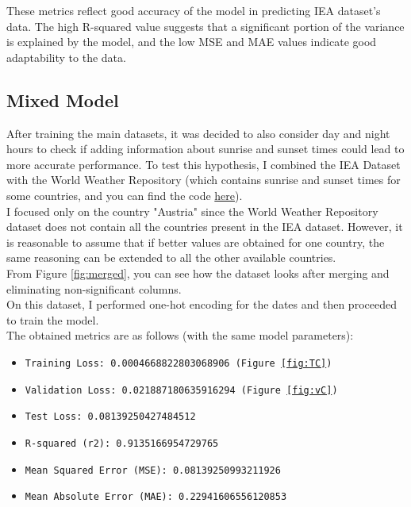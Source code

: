 \documentclass[12pt]{article}
\begin{document}
These metrics reflect good accuracy of the model in predicting IEA dataset's data. The high R-squared value suggests that a significant portion of the variance is explained by the model, and the low MSE and MAE values indicate good adaptability to the data.

\subsection{Mixed Model}
After training the main datasets, it was decided to also consider day and night hours to check if adding information about sunrise and sunset times could lead to more accurate performance. To test this hypothesis, I combined the IEA Dataset with the World Weather Repository (which contains sunrise and sunset times for some countries, and you can find the code \href{https://www.kaggle.com/code/alessandromajumba/iea-model-world-weather-repository}{here}).
\\
I focused only on the country "Austria" since the World Weather Repository dataset does not contain all the countries present in the IEA dataset. However, it is reasonable to assume that if better values are obtained for one country, the same reasoning can be extended to all the other available countries.
\\
From Figure \ref{fig:merged}, you can see how the dataset looks after merging and eliminating non-significant columns.
\\
On this dataset, I performed one-hot encoding for the dates and then proceeded to train the model.
\\
The obtained metrics are as follows (with the same model parameters):
\begin{itemize}
    \item \texttt{Training Loss: 0.0004668822803068906 (Figure \ref{fig:TC})}
    \item \texttt{Validation Loss: 0.021887180635916294 (Figure \ref{fig:vC})}
    \item \texttt{Test Loss: 0.08139250427484512}
    \item \texttt{R-squared (r2): 0.9135166954729765}
    \item \texttt{Mean Squared Error (MSE): 0.08139250993211926} 
    \item \texttt{Mean Absolute Error (MAE): 0.22941606556120853}
\end{itemize}
\end{document}
